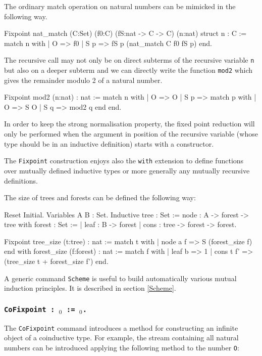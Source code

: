 The ordinary match operation on natural numbers can be mimicked in the
following way.
\begin{coq_example*}
Fixpoint nat_match (C:Set) (f0:C) (fS:nat -> C -> C) (n:nat) {struct n} : C :=
  match n with
  | O => f0
  | S p => fS p (nat_match C f0 fS p)
  end.
\end{coq_example*}
The recursive call may not only be on direct subterms of the recursive
variable {\tt n} but also on a deeper subterm and we can directly
write the function {\tt mod2} which gives the remainder modulo 2 of a
natural number.
\begin{coq_example*}
Fixpoint mod2 (n:nat) : nat :=
  match n with
  | O => O
  | S p => match p with
           | O => S O
           | S q => mod2 q
           end
  end.
\end{coq_example*}
In order to keep the strong normalisation property, the fixed point
reduction will only be performed when the argument in position of the
recursive variable (whose type should be in an inductive definition)
starts with a constructor.

The {\tt Fixpoint} construction enjoys also the {\tt with} extension
to define functions over mutually defined inductive types or more
generally any mutually recursive definitions.

\Example 
The size of trees and forests can be defined the following way: 
\begin{coq_eval}
Reset Initial.
Variables A B : Set.
Inductive tree : Set :=
    node : A -> forest -> tree
with forest : Set :=
  | leaf : B -> forest
  | cons : tree -> forest -> forest.
\end{coq_eval}
\begin{coq_example*}
Fixpoint tree_size (t:tree) : nat :=
  match t with
  | node a f => S (forest_size f)
  end
 with forest_size (f:forest) : nat :=
  match f with
  | leaf b => 1
  | cons t f' => (tree_size t + forest_size f')
  end.
\end{coq_example*}
A generic command {\tt Scheme} is useful to build automatically various
mutual induction principles. It is described in section \ref{Scheme}.

\subsubsection{\tt CoFixpoint {\ident} :
\type$_0$ := \term$_0$.}\label{CoFixpoint}

The {\tt CoFixpoint} command introduces a method for constructing an
infinite object of a coinduc\-tive type. For example, the stream
containing all natural numbers can be introduced applying the
following method to the number \texttt{O}:

